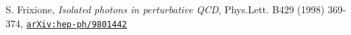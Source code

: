 \documentclass[11pt,a4paper,openright,twoside]{report}
\newcommand{\bibref}[4]{#1, \textit{#2}, #3 #4}
\begin{document}
\begin{thebibliography}{9}
	\bibref{S. Frixione}{Isolated photons in perturbative QCD}{Phys.Lett. B429 (1998) 369-374,}{\href{https://arxiv.org/abs/hep-ph/9801442}{\texttt{arXiv:hep-ph/9801442}}}
%	
%	
%	
%	
	
\end{thebibliography}
\end{document}
